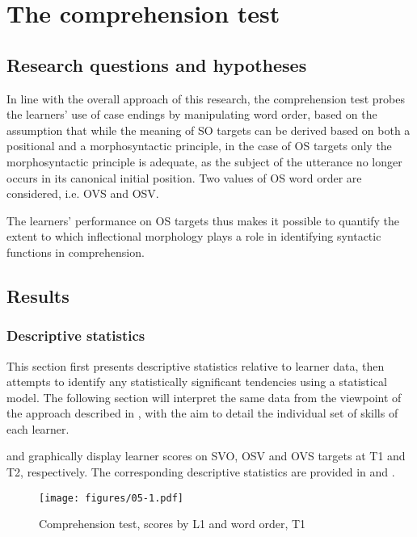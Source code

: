 \chapter{The comprehension test}\label{sec:4}

\section{Research questions and hypotheses}\label{sec:05:1}

In line with the overall approach of this research, the comprehension test probes the learners' use of case endings by manipulating word order, based on the assumption that while the meaning of SO targets can be derived based on both a positional and a morphosyntactic principle, in the case of OS targets only the morphosyntactic principle is adequate, as the subject of the utterance no longer occurs in its canonical initial position. Two values of OS word order are considered, i.e. OVS and OSV.

The learners’ performance on OS targets thus makes it possible to quantify the extent to which inflectional morphology plays a role in identifying syntactic functions in comprehension.

\section{Results}\label{sec:05:2}
\subsection{Descriptive statistics}\label{sec:05:2.1}

This section first presents descriptive statistics relative to learner data, then attempts to identify any statistically significant tendencies using a statistical model. The following section will interpret the same data from the viewpoint of the approach described in , with the aim to detail the individual set of skills of each learner.

 and  graphically display learner scores on SVO, OSV and OVS targets at T1 and T2, respectively. The corresponding descriptive statistics are provided in  and .

\begin{figure}
    \texttt{[image: figures/05-1.pdf]}
    \caption{Comprehension test, scores by L1 and word order, T1}
    \label{fig:05:1}
\end{figure}

